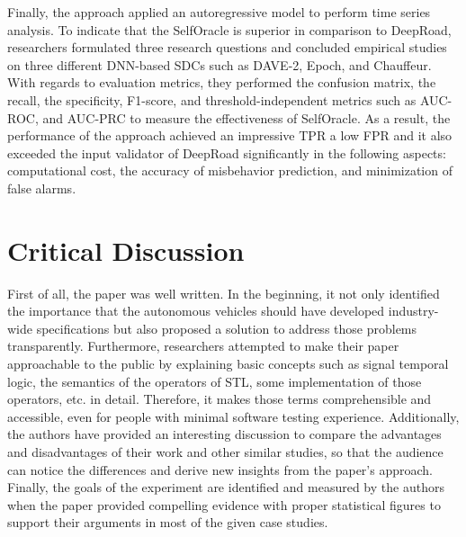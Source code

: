 \documentclass[10pt,a4paper]{report}
\begin{document}
%
Finally, the approach applied an autoregressive model to perform time series analysis.
%
To indicate that the SelfOracle is superior in comparison to DeepRoad, researchers formulated three research questions and concluded empirical studies on three different DNN-based SDCs such as DAVE-2, Epoch, and Chauffeur.
%
With regards to evaluation metrics, they performed the confusion matrix, the recall, the specificity, F1-score, and threshold-independent metrics such as AUC-ROC, and AUC-PRC to measure the effectiveness of SelfOracle.
%
As a result, the performance of the approach achieved an impressive TPR a low FPR and it also exceeded the input validator of DeepRoad significantly in the following aspects: computational cost, the accuracy of misbehavior prediction, and minimization of false alarms.


\section{Critical Discussion}
First of all, the paper was well written. In the beginning, it not only identified the importance that the autonomous vehicles should have developed industry-wide speciﬁcations but also proposed a solution to address those problems transparently.
%
Furthermore, researchers attempted to make their paper approachable to the public by explaining basic concepts such as signal temporal logic, the semantics of the operators of STL, some implementation of those operators, etc. in detail. 
%
Therefore, it makes those terms comprehensible and accessible, even for people with minimal software testing experience.
%
Additionally, the authors have provided an interesting discussion to compare the advantages and disadvantages of their work and other similar studies, so that the audience can notice the differences and derive new insights from the paper's approach.
%
Finally, the goals of the experiment are identified and measured by the authors when the paper provided compelling evidence with proper statistical figures to support their arguments in most of the given case studies.
%
\end{document}
